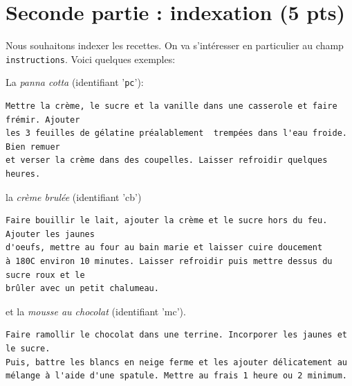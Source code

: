\documentclass[9pt,a4paper]{article}
\begin{document}
\section*{Seconde partie : indexation (5 pts)}

Nous souhaitons indexer les recettes. On va s'intéresser en particulier au champ \texttt{instructions}.
Voici quelques exemples:

La \emph{panna cotta} (identifiant '\texttt{pc}'):
\begin{small}
\begin{verbatim}
Mettre la crème, le sucre et la vanille dans une casserole et faire frémir. Ajouter 
les 3 feuilles de gélatine préalablement  trempées dans l'eau froide. Bien remuer 
et verser la crème dans des coupelles. Laisser refroidir quelques heures.
\end{verbatim}
\end{small}
la \emph{crème brulée} (identifiant 'cb')
\begin{small}
\begin{verbatim}
Faire bouillir le lait, ajouter la crème et le sucre hors du feu. Ajouter les jaunes 
d'oeufs, mettre au four au bain marie et laisser cuire doucement 
à 180C environ 10 minutes. Laisser refroidir puis mettre dessus du sucre roux et le 
brûler avec un petit chalumeau.
\end{verbatim}
\end{small}

et la \emph{mousse au chocolat} (identifiant 'mc').
\begin{small}
\begin{verbatim}
Faire ramollir le chocolat dans une terrine. Incorporer les jaunes et le sucre.
Puis, battre les blancs en neige ferme et les ajouter délicatement au 
mélange à l'aide d'une spatule. Mettre au frais 1 heure ou 2 minimum.
\end{verbatim}
\end{small}
\end{document}
